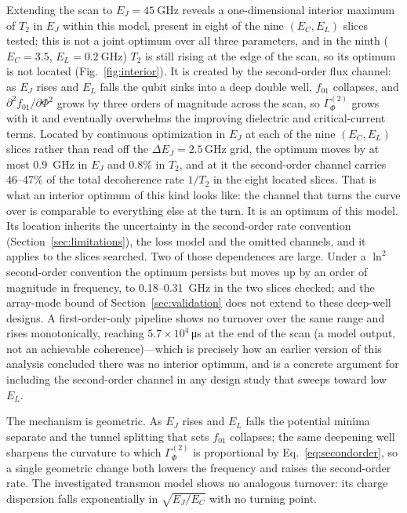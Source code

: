 \documentclass{SciPost}
\begin{document}
Extending the scan to $E_J = \SI{45}{\giga\hertz}$ reveals a one-dimensional interior maximum of $T_2$ in $E_J$ within this model, present in eight of
the nine $(E_C, E_L)$ slices tested; this is not a joint optimum over all three parameters, and in the ninth ($E_C=3.5$, $E_L=\SI{0.2}{\giga\hertz}$) $T_2$ is still rising at the edge of
the scan, so its optimum is not located (Fig.~\ref{fig:interior}). It is created by the second-order
flux channel: as $E_J$ rises and $E_L$ falls the qubit sinks into a deep double well,
$f_{01}$ collapses, and $\partial^2 f_{01}/\partial\Phi^2$ grows by three orders of
magnitude across the scan, so $\Gamma_\Phi^{(2)}$ grows with it and eventually overwhelms the improving dielectric and
critical-current terms. Located by continuous optimization in $E_J$ at each of the nine
$(E_C, E_L)$ slices rather than read off the $\Delta E_J = 2.5$\,GHz grid, the optimum moves by at most \SI{0.9}{\giga\hertz} in $E_J$ and 0.8\% in $T_2$, and at it the
second-order channel carries 46--47\% of the total decoherence rate $1/T_2$ in the eight located
slices. That is what an interior optimum of this kind looks like: the channel that turns the curve over is
comparable to everything else at the turn. It is an optimum of this model. Its location inherits the
uncertainty in the second-order rate convention (Section~\ref{sec:limitations}), the loss model and the
omitted channels, and it applies to the slices searched. Two of those dependences are large. Under
a $\ln^2$ second-order convention the optimum persists but moves up by an order of magnitude in
frequency, to 0.18--\SI{0.31}{\giga\hertz} in the two slices checked; and the array-mode bound of
Section~\ref{sec:validation} does not extend to these deep-well designs. A first-order-only
pipeline shows no turnover over the same range and rises monotonically, reaching $5.7\times10^{4}$\,\si{\micro\second} at the end of the scan (a model output, not an achievable
coherence)---which is precisely how an earlier version of this
analysis concluded there was no interior optimum, and is a concrete argument for including the
second-order channel in any design study that sweeps toward low $E_L$.

The mechanism is geometric. As $E_J$ rises and $E_L$ falls the potential minima separate and
the tunnel splitting that sets $f_{01}$ collapses; the same deepening well sharpens the
curvature to which $\Gamma_\Phi^{(2)}$ is proportional by Eq.~\eqref{eq:secondorder}, so a
single geometric change both lowers the frequency and raises the second-order rate. The
investigated transmon model shows no analogous turnover: its charge dispersion falls exponentially
in $\sqrt{E_J/E_C}$ with no turning point.
\end{document}
